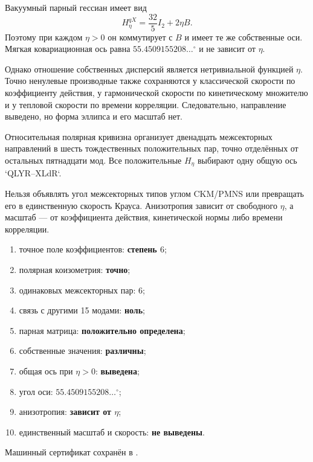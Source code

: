 Вакуумный парный гессиан имеет вид
\begin{equation}
 H_\eta^{qX}=\frac{32}{5}I_2+2\eta B.
\end{equation}
Поэтому при каждом $\eta>0$ он коммутирует с $B$ и имеет те же собственные
оси. Мягкая ковариационная ось равна
$55.4509155208\ldots^\circ$ и не зависит от $\eta$.

Однако отношение собственных дисперсий является нетривиальной функцией
$\eta$. Точно ненулевые производные также сохраняются у классической
скорости по коэффициенту действия, у гармонической скорости по
кинетическому множителю и у тепловой скорости по времени корреляции.
Следовательно, направление выведено, но форма эллипса и его масштаб нет.

\begin{theorem}
Относительная полярная кривизна организует двенадцать межсекторных
направлений в шесть тождественных положительных пар, точно отделённых от
остальных пятнадцати мод. Все положительные $H_\eta$ выбирают одну общую
ось `QLYR--XLdR`.
\end{theorem}

\begin{nogocriterion}
Нельзя объявлять угол межсекторных типов углом CKM/PMNS или превращать его в
единственную скорость Крауса. Анизотропия зависит от свободного $\eta$, а
масштаб --- от коэффициента действия, кинетической нормы либо времени
корреляции.
\end{nogocriterion}

\begin{protocol}
\begin{enumerate}
 \item точное поле коэффициентов: \textbf{степень $6$};
 \item полярная коизометрия: \textbf{точно};
 \item одинаковых межсекторных пар: \textbf{$6$};
 \item связь с другими 15 модами: \textbf{ноль};
 \item парная матрица: \textbf{положительно определена};
 \item собственные значения: \textbf{различны};
 \item общая ось при $\eta>0$: \textbf{выведена};
 \item угол оси: \textbf{$55.4509155208\ldots^\circ$};
 \item анизотропия: \textbf{зависит от $\eta$};
 \item единственный масштаб и скорость: \textbf{не выведены}.
\end{enumerate}
\end{protocol}

Машинный сертификат сохранён в
.